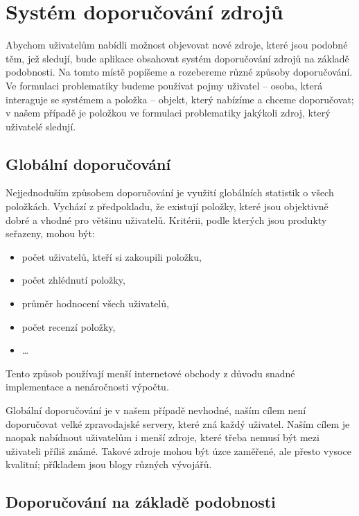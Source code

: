 \chapter{Systém doporučování zdrojů}

Abychom uživatelům nabídli možnost objevovat nové zdroje, které jsou podobné těm, jež sledují, bude aplikace obsahovat systém doporučování zdrojů na základě podobnosti.
Na tomto místě popíšeme a rozebereme různé způsoby doporučování.
Ve formulaci problematiky budeme používat pojmy uživatel -- osoba, která interaguje se systémem a položka -- objekt, který nabízíme a chceme doporučovat; v našem případě je položkou ve formulaci problematiky jakýkoli zdroj, který uživatelé sledují.

\section{Globální doporučování}

Nejjednoduším způsobem doporučování je využití globálních statistik o všech položkách.
Vychází z předpokladu, že existují položky, které jsou objektivně dobré a vhodné pro většinu uživatelů.
Kritérii, podle kterých jsou produkty seřazeny, mohou být:
\begin{itemize}
    \item počet uživatelů, kteří si zakoupili položku,
    \item počet zhlédnutí položky,
    \item průměr hodnocení všech uživatelů,
	\item počet recenzí položky,
    \item \ldots
\end{itemize}
Tento způsob používají menší internetové obchody z důvodu snadné implementace a nenáročnosti výpočtu.

Globální doporučování je v našem případě nevhodné, naším cílem není doporučovat velké zpravodajské servery, které zná každý uživatel.
Naším cílem je naopak nabídnout uživatelům i menší zdroje, které třeba nemusí být mezi uživateli příliš známé.
Takové zdroje mohou být úzce zaměřené, ale přesto vysoce kvalitní; příkladem jsou blogy různých vývojářů.

\section{Doporučování na základě podobnosti}

